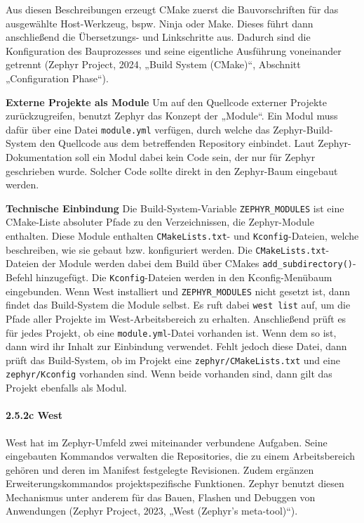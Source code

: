 Aus diesen Beschreibungen erzeugt CMake zuerst die Bauvorschriften für das ausgewählte Host-Werkzeug, bspw. Ninja oder Make. Dieses führt dann anschließend die Übersetzungs- und Linkschritte aus. Dadurch sind die Konfiguration des Bauprozesses und seine eigentliche Ausführung voneinander getrennt (Zephyr Project, 2024, „Build System (CMake)“, Abschnitt „Configuration Phase“).

\textbf{Externe Projekte als Module} Um auf den Quellcode externer Projekte zurückzugreifen, benutzt Zephyr das Konzept der „Module“. Ein Modul muss dafür über eine Datei \lstinline[style=fileinline]|module.yml| verfügen, durch welche das Zephyr-Build-System den Quellcode aus dem betreffenden Repository einbindet. Laut Zephyr-Dokumentation soll ein Modul dabei kein Code sein, der nur für Zephyr geschrieben wurde. Solcher Code sollte direkt in den Zephyr-Baum eingebaut werden.

\textbf{Technische Einbindung} Die Build-System-Variable \lstinline[style=fileinline]|ZEPHYR_MODULES| ist eine CMake-Liste absoluter Pfade zu den Verzeichnissen, die Zephyr-Module enthalten. Diese Module enthalten \lstinline[style=fileinline]|CMakeLists.txt|- und \lstinline[style=fileinline]|Kconfig|-Dateien, welche beschreiben, wie sie gebaut bzw. konfiguriert werden. Die \lstinline[style=fileinline]|CMakeLists.txt|-Dateien der Module werden dabei dem Build über CMakes \lstinline[style=fileinline]|add_subdirectory()|-Befehl hinzugefügt. Die \lstinline[style=fileinline]|Kconfig|-Dateien werden in den Kconfig-Menübaum eingebunden. Wenn West installiert und \lstinline[style=fileinline]|ZEPHYR_MODULES| nicht gesetzt ist, dann findet das Build-System die Module selbst. Es ruft dabei \lstinline[style=fileinline]|west list| auf, um die Pfade aller Projekte im West-Arbeitsbereich zu erhalten. Anschließend prüft es für jedes Projekt, ob eine \lstinline[style=fileinline]|module.yml|-Datei vorhanden ist. Wenn dem so ist, dann wird ihr Inhalt zur Einbindung verwendet. Fehlt jedoch diese Datei, dann prüft das Build-System, ob im Projekt eine \lstinline[style=fileinline]|zephyr/CMakeLists.txt| und eine \lstinline[style=fileinline]|zephyr/Kconfig| vorhanden sind. Wenn beide vorhanden sind, dann gilt das Projekt ebenfalls als Modul.

\paragraph*{\textbf{2.5.2c West}}
West hat im Zephyr-Umfeld zwei miteinander verbundene Aufgaben. Seine eingebauten Kommandos verwalten die Repositories, die zu einem Arbeitsbereich gehören und deren im Manifest festgelegte Revisionen. Zudem ergänzen Erweiterungskommandos projektspezifische Funktionen. Zephyr benutzt diesen Mechanismus unter anderem für das Bauen, Flashen und Debuggen von Anwendungen (Zephyr Project, 2023, „West (Zephyr’s meta-tool)“).


